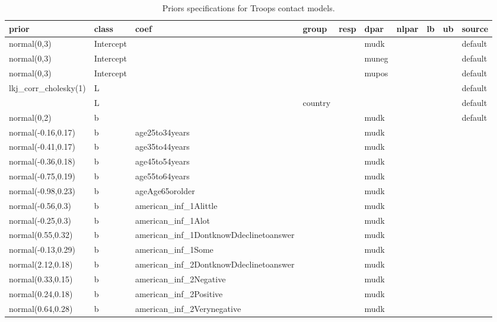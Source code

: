 \documentclass[
]{book}
\theoremstyle{definition}
\theoremstyle{definition}
\theoremstyle{definition}
\theoremstyle{definition}
\theoremstyle{remark}
\begin{document}
\begin{table}

\caption{\label{tab:prior-info-troops}Priors specifications for Troops contact models.}
\centering
\fontsize{11}{13}\selectfont
\begin{tabular}[t]{l|l|l|l|l|l|l|l|l|l}
\hline
prior & class & coef & group & resp & dpar & nlpar & lb & ub & source\\
\hline
normal(0,3) & Intercept &  &  &  & mudk &  &  &  & default\\
\hline
normal(0,3) & Intercept &  &  &  & muneg &  &  &  & default\\
\hline
normal(0,3) & Intercept &  &  &  & mupos &  &  &  & default\\
\hline
lkj\_corr\_cholesky(1) & L &  &  &  &  &  &  &  & default\\
\hline
 & L &  & country &  &  &  &  &  & default\\
\hline
normal(0,2) & b &  &  &  & mudk &  &  &  & default\\
\hline
normal(-0.16,0.17) & b & age25to34years &  &  & mudk &  &  &  & \\
\hline
normal(-0.41,0.17) & b & age35to44years &  &  & mudk &  &  &  & \\
\hline
normal(-0.36,0.18) & b & age45to54years &  &  & mudk &  &  &  & \\
\hline
normal(-0.75,0.19) & b & age55to64years &  &  & mudk &  &  &  & \\
\hline
normal(-0.98,0.23) & b & ageAge65orolder &  &  & mudk &  &  &  & \\
\hline
normal(-0.56,0.3) & b & american\_inf\_1Alittle &  &  & mudk &  &  &  & \\
\hline
normal(-0.25,0.3) & b & american\_inf\_1Alot &  &  & mudk &  &  &  & \\
\hline
normal(0.55,0.32) & b & american\_inf\_1DontknowDdeclinetoanswer &  &  & mudk &  &  &  & \\
\hline
normal(-0.13,0.29) & b & american\_inf\_1Some &  &  & mudk &  &  &  & \\
\hline
normal(2.12,0.18) & b & american\_inf\_2DontknowDdeclinetoanswer &  &  & mudk &  &  &  & \\
\hline
normal(0.33,0.15) & b & american\_inf\_2Negative &  &  & mudk &  &  &  & \\
\hline
normal(0.24,0.18) & b & american\_inf\_2Positive &  &  & mudk &  &  &  & \\
\hline
normal(0.64,0.28) & b & american\_inf\_2Verynegative &  &  & mudk &  &  &  & \\

\end{tabular}
\end{table}
\end{document}
